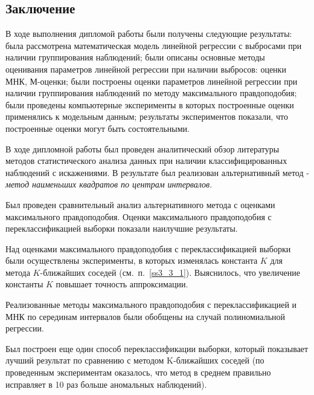 \begin{center}
    \section*{Заключение}
\end{center}
{}
В ходе выполнения дипломой работы были получены следующие результаты: была рассмотрена математическая модель линейной регрессии с выбросами при наличии группирования наблюдений; были описаны основные методы оценивания параметров линейной регрессии при наличии выбросов: оценки МНК, М-оценки;
были построены оценки параметров линейной регрессии при наличии группирования наблюдений по методу максимального правдоподобия;
были проведены компьютерные эксперименты в которых построенные оценки применялись к модельным данным;
результаты экспериментов показали, что построенные оценки могут быть состоятельными.

В ходе дипломной работы был проведен аналитический обзор литературы методов статистического анализа данных при наличии классифицированных наблюдений с искажениями.
В результате был реализован альтернативный метод - \textit{метод наименьших квадратов по центрам интервалов}.

Был проведен сравнительный анализ альтернативного метода с оценками максимального правдоподобия. Оценки максимального правдоподобия с переклассификацией выборки показали наилучшие результаты. 

Над оценками максимального правдоподобия с переклассификацией выборки были осуществлены эксперименты, в которых изменялась константа $K$ для метода $K$-ближайших соседей (см.~п.~\ref{ss3_3_1}). Выяснилось, что увеличение константы $K$ повышает точность аппроксимации.

Реализованные методы максимального правдоподобия с переклассификацией и МНК по серединам интервалов  были обобщены на случай полиномиальной регрессии.

Был построен еще один способ переклассификации выборки, который показывает лучший результат по сравнению с методом K-ближайших соседей (по проведенным экспериментам оказалось, что метод в среднем правильно исправляет в 10 раз больше аномальных наблюдений).